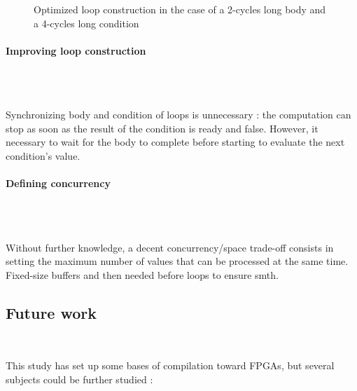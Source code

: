 \documentclass[10pt,a4paper]{article}
\renewcommand{\indent}{~\\\vspace{-.8cm}}
\newcommand{\pindent}{~\\\indent}
\begin{document}
\begin{figure}
	\caption{Optimized loop construction in the case of a 2-cycles long body and a 4-cycles long condition}
\end{figure}

\paragraph{Improving loop construction}\pindent

Synchronizing body and condition of loops is unnecessary : the computation can stop as soon as the result of the condition is ready and false. However, it necessary to wait for the body to complete before starting to evaluate the next condition's value.


\paragraph{Defining  concurrency}\pindent

Without further knowledge, a decent concurrency/space trade-off consists in setting the maximum number of values that can be processed at the same time. Fixed-size buffers and then needed before loops to ensure smth.
 
\subsection{Future work} \indent

This study has set up some bases of compilation toward FPGAs, but several subjects could be further studied :
\end{document}
